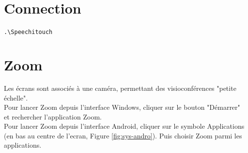\documentclass[10pt]{article}
\begin{document}
%
% 

\section{Connection}

\verb+.\Speechitouch+

\section{Zoom}

Les écrans sont associés à une caméra, permettant des visioconférences "petite échelle".\\

Pour lancer Zoom depuis l'interface Windows, cliquer sur le bouton "Démarrer" et rechercher l'application Zoom. \\ 

Pour lancer Zoom depuis l'interface Android, cliquer sur le symbole Applications (en bas au centre de l'ecran, Figure \ref{fig:sys-andro}). Puis choisir Zoom parmi les applications.\\
\end{document}
